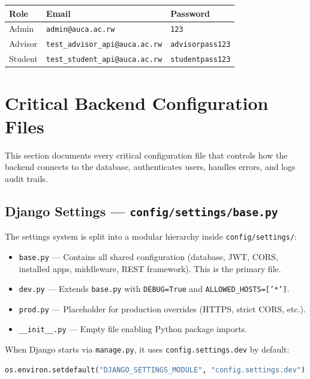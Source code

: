 \documentclass[12pt, a4paper]{article}
\begin{document}
\begin{longtable}{p{4cm}p{5.5cm}p{3cm}}
\toprule
\textbf{Role} & \textbf{Email} & \textbf{Password} \\
\midrule
Admin & \texttt{admin@auca.ac.rw} & \texttt{123} \\
Advisor & \texttt{test\_advisor\_api@auca.ac.rw} & \texttt{advisorpass123} \\
Student & \texttt{test\_student\_api@auca.ac.rw} & \texttt{studentpass123} \\
\bottomrule
\end{longtable}

\section{Critical Backend Configuration Files}

This section documents every critical configuration file that controls how the backend connects to the database, authenticates users, handles errors, and logs audit trails.

\subsection{Django Settings --- \texttt{config/settings/base.py}}

The settings system is split into a modular hierarchy inside \texttt{config/settings/}:

\begin{itemize}
    \item \texttt{base.py} --- Contains all shared configuration (database, JWT, CORS, installed apps, middleware, REST framework). This is the primary file.
    \item \texttt{dev.py} --- Extends \texttt{base.py} with \texttt{DEBUG=True} and \texttt{ALLOWED\_HOSTS=['*']}.
    \item \texttt{prod.py} --- Placeholder for production overrides (HTTPS, strict CORS, etc.).
    \item \texttt{\_\_init\_\_.py} --- Empty file enabling Python package imports.
\end{itemize}

When Django starts via \texttt{manage.py}, it uses \texttt{config.settings.dev} by default:

\begin{lstlisting}[language=Python, caption={manage.py --- Default Settings Module}]
os.environ.setdefault("DJANGO_SETTINGS_MODULE", "config.settings.dev")
\end{lstlisting}
\end{document}
